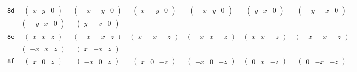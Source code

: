 \documentclass[fleqn,9pt,landscape]{jsarticle}
\begin{document}
\begin{center}
\begin{longtable}{ccccccc}
{\tt 8d} & $ \begin{pmatrix} x & y & 0 \end{pmatrix} $ & $ \begin{pmatrix} - x & - y & 0 \end{pmatrix} $ & $ \begin{pmatrix} x & - y & 0 \end{pmatrix} $ & $ \begin{pmatrix} - x & y & 0 \end{pmatrix} $ & $ \begin{pmatrix} y & x & 0 \end{pmatrix} $ & $ \begin{pmatrix} - y & - x & 0 \end{pmatrix} $ \\
& $ \begin{pmatrix} - y & x & 0 \end{pmatrix} $ & $ \begin{pmatrix} y & - x & 0 \end{pmatrix} $ & $  $ & $  $ & $  $ & $  $ \\ \hline
{\tt 8e} & $ \begin{pmatrix} x & x & z \end{pmatrix} $ & $ \begin{pmatrix} - x & - x & z \end{pmatrix} $ & $ \begin{pmatrix} x & - x & - z \end{pmatrix} $ & $ \begin{pmatrix} - x & x & - z \end{pmatrix} $ & $ \begin{pmatrix} x & x & - z \end{pmatrix} $ & $ \begin{pmatrix} - x & - x & - z \end{pmatrix} $ \\
& $ \begin{pmatrix} - x & x & z \end{pmatrix} $ & $ \begin{pmatrix} x & - x & z \end{pmatrix} $ & $  $ & $  $ & $  $ & $  $ \\ \hline
{\tt 8f} & $ \begin{pmatrix} x & 0 & z \end{pmatrix} $ & $ \begin{pmatrix} - x & 0 & z \end{pmatrix} $ & $ \begin{pmatrix} x & 0 & - z \end{pmatrix} $ & $ \begin{pmatrix} - x & 0 & - z \end{pmatrix} $ & $ \begin{pmatrix} 0 & x & - z \end{pmatrix} $ & $ \begin{pmatrix} 0 & - x & - z \end{pmatrix} $ \\

\end{longtable}
\end{center}
\end{document}
